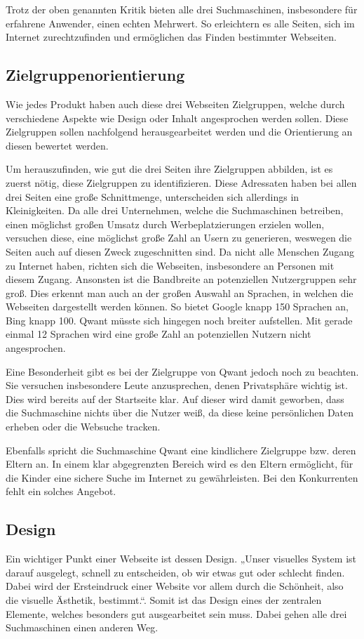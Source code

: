 Trotz der oben genannten Kritik bieten alle drei Suchmaschinen, insbesondere für erfahrene Anwender, einen echten Mehrwert.
So erleichtern es alle Seiten, sich im Internet zurechtzufinden und ermöglichen das Finden bestimmter Webseiten.

\subsection{Zielgruppenorientierung}\label{subsec:zielgruppenorientierung}
Wie jedes Produkt haben auch diese drei Webseiten Zielgruppen, welche durch verschiedene Aspekte wie Design oder Inhalt
angesprochen werden sollen.
Diese Zielgruppen sollen nachfolgend herausgearbeitet werden und die Orientierung an diesen
bewertet werden.

Um herauszufinden, wie gut die drei Seiten ihre Zielgruppen abbilden, ist es zuerst nötig, diese Zielgruppen zu identifizieren.
Diese Adressaten haben bei allen drei Seiten eine große Schnittmenge, unterscheiden sich allerdings in Kleinigkeiten.
Da alle drei Unternehmen, welche die Suchmaschinen betreiben, einen möglichst großen Umsatz durch Werbeplatzierungen
erzielen wollen, versuchen diese, eine möglichst große Zahl an Usern zu generieren, weswegen die Seiten auch auf diesen Zweck zugeschnitten sind.
Da nicht alle Menschen Zugang zu Internet haben, richten sich die Webseiten, insbesondere an Personen mit diesem Zugang.
Ansonsten ist die Bandbreite an potenziellen Nutzergruppen sehr groß.
Dies erkennt man auch an der großen Auswahl an Sprachen, in welchen die Webseiten dargestellt werden können.
So bietet Google knapp 150 Sprachen an, Bing knapp 100.
Qwant müsste sich hingegen noch breiter aufstellen.
Mit gerade einmal 12 Sprachen wird eine große Zahl an
potenziellen Nutzern nicht angesprochen.

Eine Besonderheit gibt es bei der Zielgruppe von Qwant jedoch noch zu beachten.
Sie versuchen insbesondere Leute anzusprechen, denen Privatsphäre wichtig ist.
Dies wird bereits auf der Startseite klar.
Auf dieser wird damit geworben, dass die Suchmaschine
nichts über die Nutzer weiß, da diese keine persönlichen Daten erheben oder die Websuche tracken.

Ebenfalls spricht die Suchmaschine Qwant eine kindlichere Zielgruppe bzw. deren Eltern an.
In einem klar abgegrenzten Bereich wird es den Eltern ermöglicht, für die Kinder eine sichere Suche im Internet zu gewährleisten.
Bei den Konkurrenten fehlt ein solches Angebot.

\subsection{Design}\label{subsec:design}
Ein wichtiger Punkt einer Webseite ist dessen Design.
„Unser visuelles System ist darauf ausgelegt, schnell zu entscheiden, ob wir etwas gut oder schlecht finden.
Dabei wird der Ersteindruck einer Website vor allem durch die Schönheit,
also die visuelle Ästhetik, bestimmt.“\autocite[Seite 43]{Thielsch.}.
Somit ist das Design eines der zentralen Elemente, welches besonders gut ausgearbeitet sein muss.
Dabei gehen alle drei Suchmaschinen einen anderen Weg.

